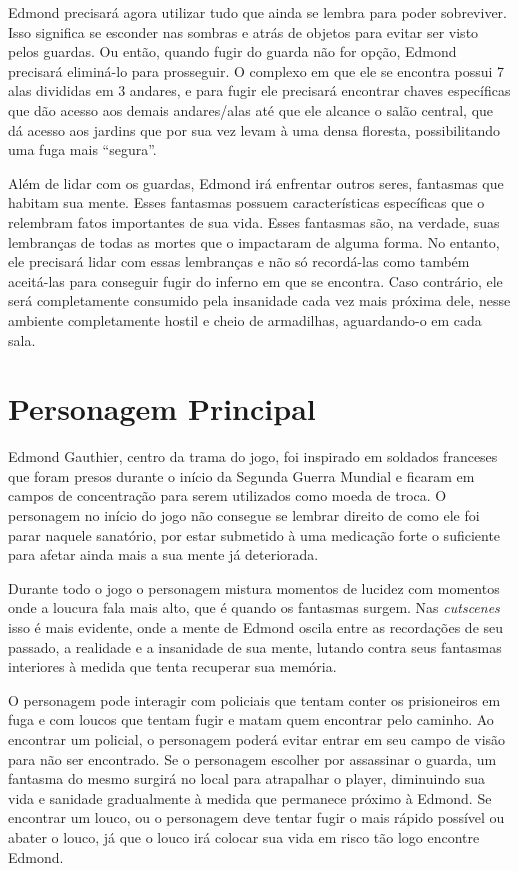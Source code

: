     Edmond precisará agora utilizar tudo que ainda se lembra para poder sobreviver. Isso significa se esconder nas sombras e atrás de objetos para evitar ser visto pelos guardas. Ou então, quando fugir do guarda não for opção, Edmond precisará eliminá-lo para prosseguir. O complexo em que ele se encontra possui 7 alas divididas em 3 andares, e para fugir ele precisará encontrar chaves específicas que dão acesso aos demais andares/alas até que ele alcance o salão central, que dá acesso aos jardins que por sua vez levam à uma densa floresta, possibilitando uma fuga mais “segura”.
    
    Além de lidar com os guardas, Edmond irá enfrentar outros seres, fantasmas que habitam sua mente. Esses fantasmas possuem características específicas que o relembram fatos importantes de sua vida. Esses fantasmas são, na verdade, suas lembranças de todas as mortes que o impactaram de alguma forma. No entanto, ele precisará lidar com essas lembranças e não só recordá-las como também aceitá-las para conseguir fugir do inferno em que se encontra. Caso contrário, ele será completamente consumido pela insanidade cada vez mais próxima dele, nesse ambiente completamente hostil e cheio de armadilhas, aguardando-o em cada sala. 

\section{Personagem Principal}
Edmond Gauthier, centro da trama do jogo, foi inspirado em soldados franceses que foram presos durante o início da Segunda Guerra Mundial e ficaram em campos de concentração para serem utilizados como moeda de troca. O personagem no início do jogo não consegue se lembrar direito de como ele foi parar naquele sanatório, por estar submetido à uma medicação forte o suficiente para afetar ainda mais a sua mente já deteriorada.

Durante todo o jogo o personagem mistura momentos de lucidez com momentos onde a loucura fala mais alto, que é quando os fantasmas surgem. Nas \textit{cutscenes} isso é mais evidente, onde a mente de Edmond oscila entre as recordações de seu passado, a realidade e a insanidade de sua mente, lutando contra seus fantasmas interiores à medida que tenta recuperar sua memória.

O personagem pode interagir com policiais que tentam conter os prisioneiros em fuga e com loucos que tentam fugir e matam quem encontrar pelo caminho. Ao encontrar um policial, o personagem poderá evitar entrar em seu campo de visão para não ser encontrado. Se o personagem escolher por assassinar o guarda, um fantasma do mesmo surgirá no local para atrapalhar o player, diminuindo sua vida e sanidade gradualmente à medida que permanece próximo à Edmond. Se encontrar um louco, ou o personagem deve tentar fugir o mais rápido possível ou abater o louco, já que o louco irá colocar sua vida em risco tão logo encontre Edmond.

